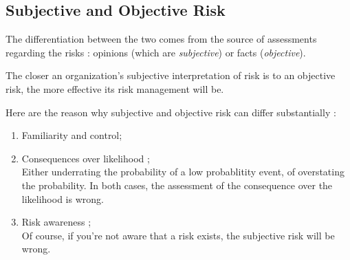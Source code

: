 \documentclass[11pt, english]{memoir}
\numberwithin{definition}{section}
\newenvironment{smalltext}
{\footnotesize }{\normalsize}
\begin{document}
\subsection{Subjective and Objective Risk}

The differentiation between the two comes from the source of assessments regarding the risks : opinions (which are \emph{subjective}) or facts (\emph{objective}).

The closer an organization's subjective interpretation of risk is to an objective risk, the more effective its risk management will be. 

Here are the reason why subjective and objective risk can differ substantially  : 
\begin{enumerate}
	\item Familiarity and control;
	\item Consequences over likelihood ;\\
	\begin{smalltext}
		Either underrating the probability of a low probablitity event, of overstating the probability. In both cases, the assessment of the consequence over the likelihood is wrong.
	\end{smalltext}
	\item Risk awareness ;\\
	\begin{smalltext}
		Of course, if you're not aware that a risk exists, the subjective risk will be wrong.
	\end{smalltext}
\end{enumerate}













	
\end{document}
